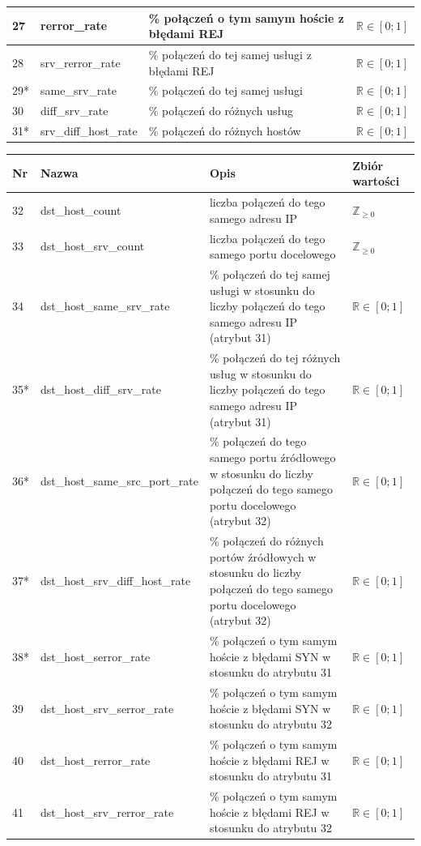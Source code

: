 \documentclass[a4paper, 12pt]{article}
\begin{document}
\begin{tabular}{ | l | l | p{6cm} | p{} | }
27      & rerror\_rate        & \% połączeń o tym samym hoście z błędami REJ   & $\mathbb{R} \in [0; 1]$ \\ \hline
28      & srv\_rerror\_rate   & \% połączeń do tej samej usługi z błędami REJ  & $\mathbb{R} \in [0; 1]$ \\ \hline
29*      & same\_srv\_rate     & \% połączeń do tej samej usługi  &  $\mathbb{R} \in [0; 1]$ \\ \hline
30      & diff\_srv\_rate     & \% połączeń do różnych usług &  $\mathbb{R} \in [0; 1]$ \\ \hline  
31*      & srv\_diff\_host\_rate   & \% połączeń do różnych hostów   & $\mathbb{R} \in [0; 1]$ \\ \hline
\end{tabular}

\begin{tabular}{ | l | l | p{5cm} | p{} | } \hline
Nr & Nazwa & Opis & Zbiór wartości \\ \hline
32      & dst\_host\_count & liczba połączeń do tego samego adresu IP  &  $\mathbb Z_{\ge 0}$ \\ \hline
33      & dst\_host\_srv\_count  & liczba połączeń do tego samego portu docelowego   & $\mathbb Z_{\ge 0}$ \\ \hline
34      & dst\_host\_same\_srv\_rate  & \% połączeń do tej samej usługi w stosunku do liczby połączeń do tego samego adresu IP (atrybut 31) & $\mathbb{R} \in [0; 1]$ \\ \hline
35*      & dst\_host\_diff\_srv\_rate  & \% połączeń do tej różnych usług w stosunku do liczby połączeń do tego samego adresu IP (atrybut 31) & $\mathbb{R} \in [0; 1]$ \\ \hline
36*      & dst\_host\_same\_src\_port\_rate & \% połączeń do tego samego portu źródłowego w stosunku do liczby połączeń do tego samego portu docelowego (atrybut 32)  & $\mathbb{R} \in [0; 1]$ \\ \hline
37*      & dst\_host\_srv\_diff\_host\_rate & \% połączeń do różnych portów źródłowych w stosunku do liczby połączeń do tego samego portu docelowego (atrybut 32)  &  $\mathbb{R} \in [0; 1]$ \\ \hline

38*      & dst\_host\_serror\_rate       & \% połączeń o tym samym hoście z błędami SYN w stosunku do atrybutu 31        &  $\mathbb{R} \in [0; 1]$ \\ \hline  
39      & dst\_host\_srv\_serror\_rate  & \% połączeń o tym samym hoście z błędami SYN w stosunku do atrybutu 32 & $\mathbb{R} \in [0; 1]$ \\ \hline

40      & dst\_host\_rerror\_rate        & \% połączeń o tym samym hoście z błędami REJ w stosunku do atrybutu 31 & $\mathbb{R} \in [0; 1]$ \\ \hline
41      & dst\_host\_srv\_rerror\_rate   & \% połączeń o tym samym hoście z błędami REJ w stosunku do atrybutu 32 & $\mathbb{R} \in [0; 1]$ \\ \hline
\end{tabular}
\end{document}
